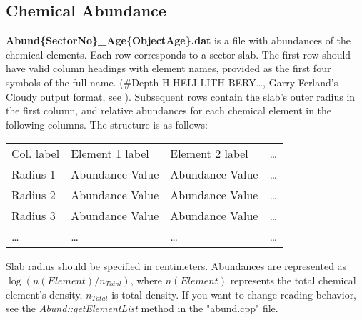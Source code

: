 \documentclass[a4paper]{article}
\begin{document}
\subsection{Chemical Abundance}
{\bf Abund\{SectorNo\}\_Age\{ObjectAge\}.dat} is a file with abundances of the chemical elements.
Each row corresponds to a sector slab.
The first row should have valid column headings with element names, provided as the first four symbols of the full name.
(\#Depth H HELI LITH BERY\ldots, Garry Ferland's Cloudy output format, see \cite{Cloudy}).
Subsequent rows contain the slab's outer radius in the first column, and relative abundances for
each chemical element in the following columns. The structure is as follows:
\begin{table}[H]
    \begin{tabular}{llll}
        Col. label & Element 1 label & Element 2 label & \ldots \\
        Radius 1 & Abundance Value & Abundance Value & \ldots \\
        Radius 2 & Abundance Value & Abundance Value & \ldots \\
        Radius 3 & Abundance Value & Abundance Value & \ldots \\
        \ldots & \ldots & \ldots & \ldots \\
    \end{tabular}
\end{table}
Slab radius should be specified in centimeters.
Abundances are represented as $\log(n(Element) / n_{Total})$, where $n(Element)$ represents the total chemical element's density,
$n_{Total}$ is total density.
If you want to change reading behavior, see the {\it Abund::getElementList} method in the "abund.cpp" file.
\end{document}
